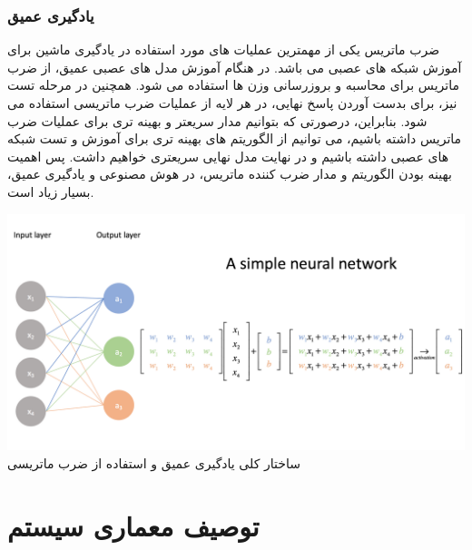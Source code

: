 \documentclass[12pt,titlepage,a4page , tikz , multi,table , svgnames,xcdraw]{article}
\begin{document}
\subsubsection{یادگیری عمیق}
	ضرب ماتریس یکی از مهمترین عملیات های مورد استفاده در یادگیری ماشین برای آموزش شبکه های عصبی می باشد. در هنگام آموزش مدل های عصبی عمیق، از ضرب ماتریس برای محاسبه و بروزرسانی وزن ها استفاده می شود. همچنین در مرحله تست نیز، برای بدست آوردن پاسخ نهایی، در هر لایه از عملیات ضرب ماتریسی استفاده می شود. بنابراین، درصورتی که بتوانیم مدار سریعتر و بهینه تری برای عملیات ضرب ماتریس داشته باشیم، می توانیم از الگوریتم های بهینه تری برای آموزش و تست شبکه های عصبی داشته باشیم و در نهایت مدل نهایی سریعتری خواهیم داشت. پس اهمیت بهینه بودن الگوریتم و مدار ضرب کننده ماتریس، در هوش مصنوعی و یادگیری عمیق، بسیار زیاد است.
    
\begin{center}
\includegraphics[scale=0.45] {Images/Introduction/Matrix_mult_deep_learning.png}\\
\caption{ساختار کلی یادگیری عمیق و استفاده از ضرب ماتریسی}
\end{center}


\newpage


\section{توصیف معماری سیستم}
\end{document}

